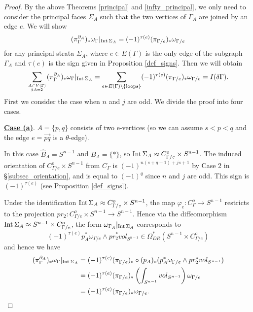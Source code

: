 \begin{proof}
By the above Theorems \ref{principal} and \ref{infty_principal}, we only need to consider the principal faces
$\Sigma_A$ such that the two vertices of $\Gamma_A$ are joined by an edge $e$.
We will show
\[
 (\pi^{\partial_A}_{\Gamma})_* \omega_{\Gamma}|_{\mathrm{Int}\, \Sigma_A} = (-1)^{\tau (e)}(\pi_{\Gamma /e})_* \omega_{\Gamma /e}
\]
for any principal strata $\Sigma_A$, where $e\in E(\Gamma )$ is the only edge of the subgraph $\Gamma_A$ and $\tau (e)$
is the sign given in Proposition \ref{def_signs}.
Then we will obtain
\[
 \sum_{\genfrac{}{}{0pt}{}{A \subset V(\Gamma )}{\sharp A=2}}
 (\pi^{\partial_A}_{\Gamma})_* \omega_{\Gamma}|_{\Int \Sigma_A}
 = \sum_{e \in E(\Gamma ) \setminus \{ \text{loops}\}} (-1)^{\tau (e)}(\pi_{\Gamma /e})_* \omega_{\Gamma /e}
 =I(\delta \Gamma ).
\]
First we consider the case when $n$ and $j$ are odd.
We divide the proof into four cases.


\noindent
\underline{\bf Case (a)}.
$A=\{ p,q \}$ consists of two e-vertices (so we can assume $s < p < q$ and the edge $e = \overrightarrow{pq}$
is a $\theta$-edge).


In this case $\hat{B}_A = S^{n-1}$ and $B_A =\{ * \}$, so $\mathrm{Int}\, \Sigma_A \approx C^o_{\Gamma /e} \times S^{n-1}$.
The induced orientation of $C^o_{\Gamma /e} \times S^{n-1}$ from $C_{\Gamma}$ is $(-1)^{n(s+q-1)+js+1}$ by Case 2 in
\S \ref{subsec_orientation}, and is equal to $(-1)^q$ since $n$ and $j$ are odd.
This sign is $(-1)^{\tau (e)}$ (see Proposition \ref{def_signs}).


Under the identification $\mathrm{Int}\, \Sigma_A \approx C^o_{\Gamma /e} \times S^{n-1}$, the map
$\varphi_e : C^o_{\Gamma} \to S^{n-1}$ restricts to the projection $pr_2 : C^o_{\Gamma /e} \times S^{n-1} \to S^{n-1}$.
Hence via the diffeomorphism $\mathrm{Int}\, \Sigma_A \approx S^{n-1} \times C^o_{\Gamma /e}$, the form
$\omega_{\Gamma_A}|_{\mathrm{Int}\, \Sigma_A}$ corresponds to
\[
  (-1)^{\tau (e)} p^*_A \omega_{\Gamma /e} \wedge pr^*_2 vol_{S^{n-1}}
 \in \Omega^*_{DR}(S^{n-1} \times C^o_{\Gamma /e})
\]
and hence we have
\begin{align*}
 (\pi^{\partial_A}_{\Gamma})_* \omega_{\Gamma}|_{\mathrm{Int}\, \Sigma_A}
 &= (-1)^{\tau (e)} (\pi_{\Gamma / e})_* \circ (p_A )_* (p^*_A \omega_{\Gamma / e} \wedge pr^*_2 vol_{S^{n-1}}) \\
 &= (-1)^{\tau (e)} (\pi_{\Gamma / e})_* \left( \int_{S^{n-1}} vol_{S^{n-1}} \right) \omega_{\Gamma / e} \\
 &= (-1)^{\tau (e)} (\pi_{\Gamma / e})_* \omega_{\Gamma / e}.
\end{align*}



\end{proof}
